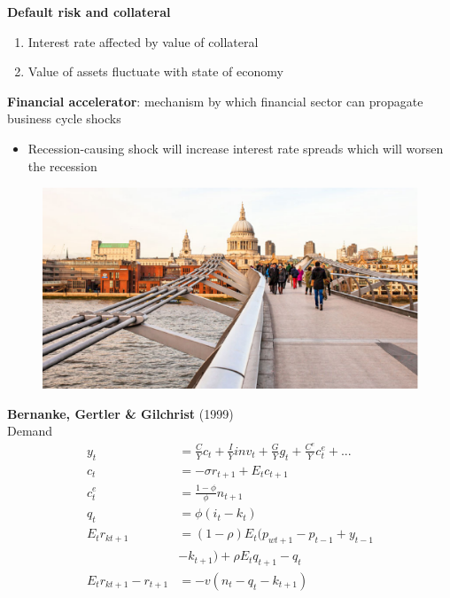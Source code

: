 \documentclass{beamer}
\begin{document}
\begin{frame}
 \textbf{Default risk and collateral}  
\begin{enumerate}
  \item Interest rate affected by value of collateral
  \item Value of assets fluctuate with state of economy
\end{enumerate}
 \medskip
 \textbf{Financial accelerator}: mechanism by which financial sector can propagate business cycle shocks 
 \begin{itemize}
   \item Recession-causing shock will increase interest rate spreads which will worsen the recession
 \end{itemize}
\end{frame}

\begin{frame}
  \begin{figure}
    \includegraphics[scale=.3]{millenium_bridge.eps}
  \end{figure}
\end{frame}

\begin{frame}
\textbf{Bernanke, Gertler \& Gilchrist} (1999) \\
  Demand
\begin{align}
  y_t &= \frac{C}{Y}c_t + \frac{I}{Y}inv_t + \frac{G}{Y}g_t + \frac{C^e}{Y}c^e_t+...\\
  c_t &= -\sigma r_{t+1} + E_tc_{t+1}\\
  c^e_t &= \frac{1-\phi}{\phi}n_{t+1}\\
  q_t &= \phi(i_t-k_t)  \\
  E_tr_{kt+1} &= (1-\rho)E_t(p_{wt+1}-p_{t-1} + y_{t-1} \\ \nonumber &- k_{t+1}) + \rho E_tq_{t+1} -q_t\\
  E_tr_{kt+1} - r_{t+1} &= -v(n_t -q_t -k_{t+1})  
\end{align}
\end{frame}
\end{document}
